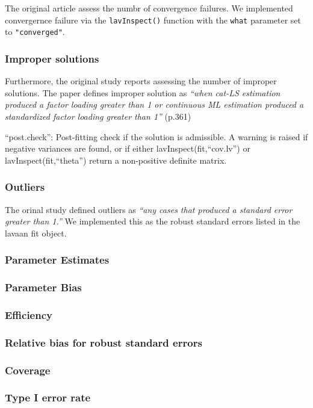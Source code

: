 \documentclass[10,a4paperpaper,]{article}
\begin{document}
The original article assess the numbr of convergence failures. We
implemented convergernce failure via the \texttt{lavInspect()} function
with the \texttt{what} parameter set to \texttt{"converged"}.

\subsubsection{Improper solutions}

Furthermore, the original study reports assessing the number of improper
solutions. The paper defines improper solution as \emph{``when cat-LS
estimation produced a factor loading greater than 1 or continuous ML
estimation produced a standardized factor loading greater than 1''}
(p.361)

``post.check'': Post-fitting check if the solution is admissible. A
warning is raised if negative variances are found, or if either
lavInspect(fit,``cov.lv'') or lavInspect(fit,``theta'') return a
non-positive definite matrix.

\subsubsection{Outliers}

The orinal study defined outliers as \emph{``any cases that produced a
standard error greater than 1.''} We implemented this as the robust
standard errors listed in the lavaan fit object.

\subsubsection{Parameter Estimates}
\subsubsection{Parameter Bias}
\subsubsection{Efficiency}
\subsubsection{Relative bias for robust standard errors}
\subsubsection{Coverage}
\subsubsection{Type I error rate}
\end{document}
